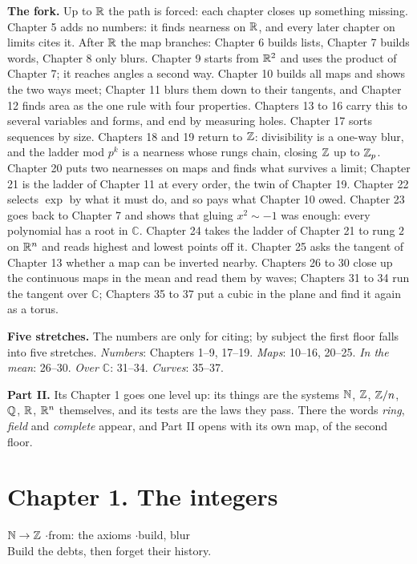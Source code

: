 \textbf{The fork.} Up to $\mathbb{R}$ the path is forced: each chapter closes up something missing. Chapter 5 adds no numbers: it finds nearness on $\mathbb{R}$, and every later chapter on limits cites it. After $\mathbb{R}$ the map branches: Chapter 6 builds lists, Chapter 7 builds words, Chapter 8 only blurs. Chapter 9 starts from $\mathbb{R}^2$ and uses the product of Chapter 7; it reaches angles a second way. Chapter 10 builds all maps and shows the two ways meet; Chapter 11 blurs them down to their tangents, and Chapter 12 finds area as the one rule with four properties. Chapters 13 to 16 carry this to several variables and forms, and end by measuring holes. Chapter 17 sorts sequences by size. Chapters 18 and 19 return to $\mathbb{Z}$: divisibility is a one-way blur, and the ladder mod $p^k$ is a nearness whose rungs chain, closing $\mathbb{Z}$ up to $\mathbb{Z}_p$. Chapter 20 puts two nearnesses on maps and finds what survives a limit; Chapter 21 is the ladder of Chapter 11 at every order, the twin of Chapter 19. Chapter 22 selects $\exp$ by what it must do, and so pays what Chapter 10 owed. Chapter 23 goes back to Chapter 7 and shows that gluing $x^2 \sim -1$ was enough: every polynomial has a root in $\mathbb{C}$. Chapter 24 takes the ladder of Chapter 21 to rung $2$ on $\mathbb{R}^n$ and reads highest and lowest points off it. Chapter 25 asks the tangent of Chapter 13 whether a map can be inverted nearby. Chapters 26 to 30 close up the continuous maps in the mean and read them by waves; Chapters 31 to 34 run the tangent over $\mathbb{C}$; Chapters 35 to 37 put a cubic in the plane and find it again as a torus.

\textbf{Five stretches.} The numbers are only for citing; by subject the first floor falls into five stretches. \emph{Numbers}: Chapters 1--9, 17--19. \emph{Maps}: 10--16, 20--25. \emph{In the mean}: 26--30. \emph{Over $\mathbb{C}$}: 31--34. \emph{Curves}: 35--37.

\textbf{Part II.} Its Chapter 1 goes one level up: its things are the systems $\mathbb{N}$, $\mathbb{Z}$, $\mathbb{Z}/n$, $\mathbb{Q}$, $\mathbb{R}$, $\mathbb{R}^n$ themselves, and its tests are the laws they pass. There the words \emph{ring}, \emph{field} and \emph{complete} appear, and Part II opens with its own map, of the second floor.

\newpage

\section*{Chapter 1. The integers}
\begin{center}
{\normalsize $\mathbb{N} \to \mathbb{Z}$ \quad$\cdot$\quad from: the axioms \quad$\cdot$\quad build, blur}\\[4pt]
{\small Build the debts, then forget their history.}
\end{center}

